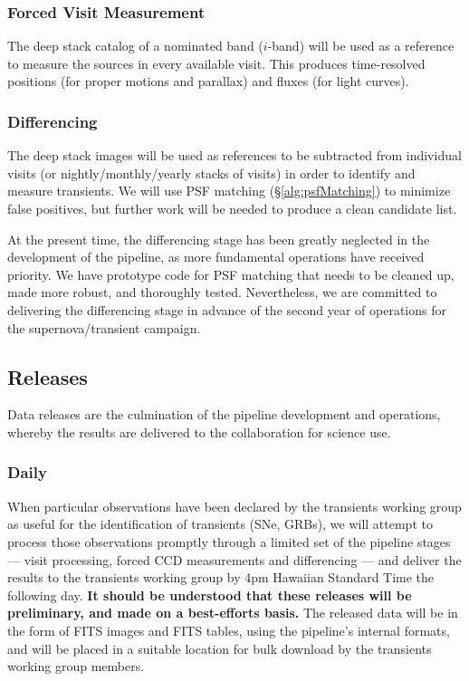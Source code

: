 \documentclass[12pt]{article}
\begin{document}
\subsubsection{Forced Visit Measurement}

The deep stack catalog of a nominated band ($i$-band) will be used as a reference to measure the sources in
every available visit.  This produces time-resolved positions (for proper motions and parallax) and fluxes
(for light curves).


\subsubsection{Differencing}

The deep stack images will be used as references to be subtracted from individual visits (or
nightly/monthly/yearly stacks of visits) in order to identify and measure transients.  We will use PSF matching
(\S\ref{alg:psfMatching}) to minimize false positives, but further work will be needed to produce a clean
candidate list.

At the present time, the differencing stage has been greatly neglected in the development of the pipeline, as
more fundamental operations have received priority.  We have prototype code for PSF matching that needs to be
cleaned up, made more robust, and thoroughly tested.  Nevertheless, we are committed to delivering the
differencing stage in advance of the second year of operations for the supernova/transient campaign.


\subsection{Releases}

Data releases are the culmination of the pipeline development and operations, whereby the results are delivered
to the collaboration for science use.

\subsubsection{Daily}

When particular observations have been declared by the transients working group as useful for the
identification of transients (SNe, GRBs), we will attempt to process those observations promptly through a
limited set of the pipeline stages --- visit processing, forced CCD measurements and differencing --- and
deliver the results to the transients working group by 4pm Hawaiian Standard Time the following day.  {\bf It
  should be understood that these releases will be preliminary, and made on a best-efforts basis.}  The
released data will be in the form of FITS images and FITS tables, using the pipeline's internal formats, and
will be placed in a suitable location for bulk download by the transients working group members.
\end{document}
